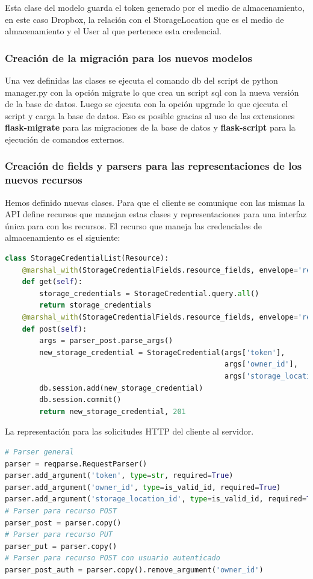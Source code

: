 \documentclass[a4paper,12pt]{article}
\begin{document}
Esta clase del modelo guarda el token generado por el medio de almacenamiento, en este caso Dropbox, la relación con el StorageLocation que es el medio de almacenamiento y el User al que pertenece esta credencial.

\subsubsection{Creación de la migración para los nuevos modelos}

Una vez definidas las clases se ejecuta el comando db del script de python manager.py con la opción migrate lo que crea un script sql con la nueva versión de la base de datos. Luego se ejecuta con la opción upgrade lo que ejecuta el script y carga la base de datos. Eso es posible gracias al uso de las extensiones \textbf{flask-migrate} para las migraciones de la base de datos y \textbf{flask-script} para la ejecución de comandos externos.

\subsubsection{Creación de fields y parsers para las representaciones de los nuevos recursos}

Hemos definido nuevas clases. Para que el cliente se comunique con las mismas la API define recursos que manejan estas clases y representaciones para una interfaz única para con los recursos. El recurso que maneja las credenciales de almacenamiento es el siguiente:
\begin{lstlisting}[language=Python]
	class StorageCredentialList(Resource):
    @marshal_with(StorageCredentialFields.resource_fields, envelope='resource')
    def get(self):
        storage_credentials = StorageCredential.query.all()
        return storage_credentials
    @marshal_with(StorageCredentialFields.resource_fields, envelope='resource')
    def post(self):
        args = parser_post.parse_args()
        new_storage_credential = StorageCredential(args['token'],
                                                   args['owner_id'],
                                                   args['storage_location_id'])
        db.session.add(new_storage_credential)
        db.session.commit()
        return new_storage_credential, 201
\end{lstlisting}

La representación para las solicitudes HTTP del cliente al servidor.

\begin{lstlisting}[language=Python]
# Parser general
parser = reqparse.RequestParser()
parser.add_argument('token', type=str, required=True)
parser.add_argument('owner_id', type=is_valid_id, required=True)
parser.add_argument('storage_location_id', type=is_valid_id, required=True)
# Parser para recurso POST
parser_post = parser.copy()
# Parser para recurso PUT
parser_put = parser.copy()
# Parser para recurso POST con usuario autenticado
parser_post_auth = parser.copy().remove_argument('owner_id')
\end{lstlisting}
\end{document}
